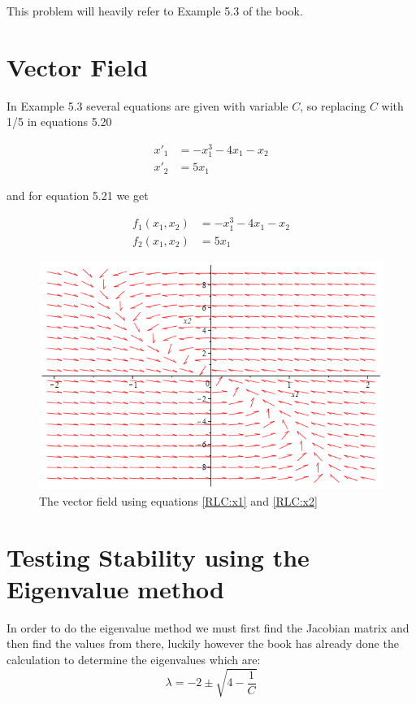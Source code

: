 \documentclass[12pt]{report}
\begin{document}
This problem will heavily refer to Example 5.3 of the book.

\section{Vector Field}

In Example 5.3 several equations are given with variable $C$, so replacing $C$ with 1/5 in equations 5.20

\begin{align}
    x'_1 &= -x^3_1-4x_1-x_2 \label{RLC:x1} \\
    x'_2 &= 5x_1 \label{RLC:x2}
\end{align}

and for equation 5.21 we get 

\begin{align}
    f_1(x_1,x_2) &= -x_1^3-4x_1-x_2 \label{RLC:f1}\\
    f_2(x_1,x_2) &= 5x_1 \label{RLC:f2}
\end{align}

\begin{figure}[h]
    \centering
    \includegraphics[width=5in]{vector.png}
    \caption{The vector field using equations \ref{RLC:x1} and \ref{RLC:x2}}
    \label{fig:vector}
\end{figure}

\section{Testing Stability using the Eigenvalue method}

In order to do the eigenvalue method we must first find the Jacobian matrix and then find the values from there, luckily however the book has already done the calculation to determine the eigenvalues which are: $$\lambda = -2 \pm \sqrt{4-\dfrac{1}{C}}$$
\end{document}
